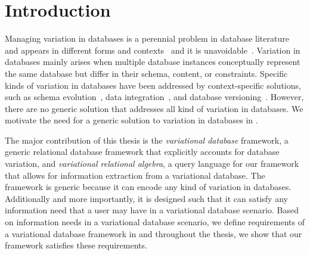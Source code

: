 \chapter{Introduction}
\label{ch:intro}

%


Managing variation in databases is a perennial problem in database literature
and appears in different forms and 
contexts~\cite{curateVdata,ALW21vamos,ready17cidr,clams16sigmod,datahub15cidr}
and it is unavoidable~\cite{dbDecay16Stonebraker}.
%
Variation in databases mainly arises when multiple database instances 
conceptually represent the same database but differ
in their schema, content, or constraints.
%
Specific kinds of variation in databases have been addressed by 
context-specific solutions, such as
schema evolution~\cite{SchEvolRA90McKenzie, 
schVersioning97Castro, tempSchEvol91Ariav, tsql95Snodgrass, 
prima08Moon}, 
data integration~\cite{dataIntegBook}, 
and database versioning~\cite{datasetVersioning,dbVersioning}.
%
However, there are no generic solution that addresses all kind of variation
in databases. We motivate the need for a generic solution to variation
in databases in .
%


The major contribution of this thesis is the \emph{variational database} framework,
a generic relational database framework that explicitly accounts for database variation,
and \emph{variational relational algebra}, a query language for our framework
that allows for information extraction from a variational database. 
The framework is generic because it can encode any kind of variation
in databases. Additionally and more importantly, it is designed such that it can satisfy
any information need that a user may have in a variational database scenario. 
Based on information needs in a variational database scenario, we define 
requirements of a variational database framework in  and throughout the
thesis, we show that our framework satisfies these requirements.

